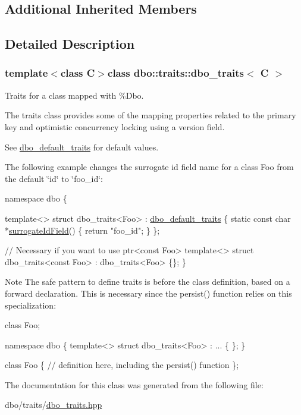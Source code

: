 \subsection*{Additional Inherited Members}


\subsection{Detailed Description}
\subsubsection*{template$<$class C$>$class dbo\+::traits\+::dbo\+\_\+traits$<$ C $>$}

Traits for a class mapped with \%Dbo. 

The traits class provides some of the mapping properties related to the primary key and optimistic concurrency locking using a version field.

See \hyperlink{structdbo__default__traits}{dbo\+\_\+default\+\_\+traits} for default values.

The following example changes the surrogate id field name for a class {\ttfamily Foo} from the default {\ttfamily \char`\"{}id\char`\"{}} to {\ttfamily \char`\"{}foo\+\_\+id\char`\"{}}\+:


\begin{DoxyCode}
\textcolor{keyword}{namespace }dbo \{

  \textcolor{keyword}{template}<>
  \textcolor{keyword}{struct }dbo\_traits<Foo> : \hyperlink{structdbo__default__traits}{dbo\_default\_traits}
  \{
     \textcolor{keyword}{static} \textcolor{keyword}{const} \textcolor{keywordtype}{char} *\hyperlink{structdbo__default__traits_a7f0ee1558eb51f77cc1843f5fcf19057}{surrogateIdField}() \{ \textcolor{keywordflow}{return} \textcolor{stringliteral}{"foo\_id"}; \}
  \};

  \textcolor{comment}{// Necessary if you want to use ptr<const Foo>}
  \textcolor{keyword}{template}<> \textcolor{keyword}{struct }dbo\_traits<const Foo> : dbo\_traits<Foo> \{\};
\}
\end{DoxyCode}


\begin{DoxyNote}{Note}
The safe pattern to define traits is before the class definition, based on a forward declaration. This is necessary since the persist() function relies on this specialization\+: 
\begin{DoxyCode}
\textcolor{keyword}{class }Foo;

  \textcolor{keyword}{namespace }dbo \{
    \textcolor{keyword}{template}<> \textcolor{keyword}{struct }dbo\_traits<Foo> : ... \{ \};
  \}

\textcolor{keyword}{class }Foo \{
  \textcolor{comment}{// definition here, including the persist() function}
\};
\end{DoxyCode}
 
\end{DoxyNote}


The documentation for this class was generated from the following file\+:\begin{DoxyCompactItemize}
\item 
dbo/traits/\hyperlink{dbo__traits_8hpp}{dbo\+\_\+traits.\+hpp}\end{DoxyCompactItemize}
